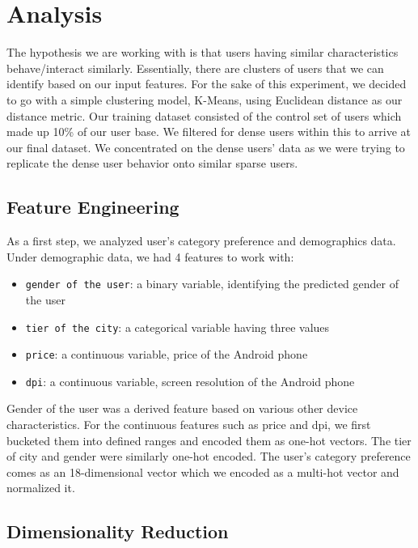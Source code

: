 \section{Analysis}

The hypothesis we are working with is that users having similar characteristics behave/interact similarly. Essentially, there are clusters of users that we can identify based on our input features. For the sake of this experiment, we decided to go with a simple clustering model, K-Means, using Euclidean distance as our distance metric. Our training dataset consisted of the control set of users which made up 10\% of our user base. We filtered for dense users within this to arrive at our final dataset. We concentrated on the dense users’ data as we were trying to replicate the dense user behavior onto similar sparse users. 



\subsection{Feature Engineering}

As a first step, we analyzed user's category preference and demographics data. Under demographic data, we had 4 features to work with: 

\begin{itemize}
    \item{\verb|gender of the user|}: a binary variable, identifying the predicted gender of the user 
    \item{\verb|tier of the city|}: a categorical variable having three values
    \item{\verb|price|}: a continuous variable, price of the Android phone
    \item{\verb|dpi|}: a continuous variable, screen resolution of the Android phone
\end{itemize}

Gender of the user was a derived feature based on various other device characteristics. For the continuous features such as price and dpi, we first bucketed them into defined ranges and encoded them as one-hot vectors. The tier of city and gender were similarly one-hot encoded. The user’s category preference comes as an 18-dimensional vector which we encoded as a multi-hot vector and normalized it. 




\subsection{Dimensionality Reduction}

